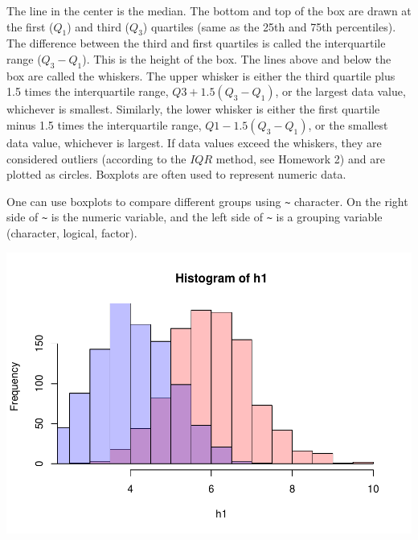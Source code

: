 \documentclass[
]{book}
\newenvironment{Shaded}{\begin{snugshade}}{\end{snugshade}}
\newcommand{\DecValTok}[1]{\textcolor[rgb]{0.00,0.00,0.81}{#1}}
\newcommand{\KeywordTok}[1]{\textcolor[rgb]{0.13,0.29,0.53}{\textbf{#1}}}
\newcommand{\NormalTok}[1]{#1}
\newcommand{\OperatorTok}[1]{\textcolor[rgb]{0.81,0.36,0.00}{\textbf{#1}}}
\newcommand{\StringTok}[1]{\textcolor[rgb]{0.31,0.60,0.02}{#1}}
\begin{document}
The line in the center is the median. The bottom and top of the box are drawn at the first (\(Q_1\)) and third (\(Q_3\)) quartiles (same as the 25th and 75th percentiles). The difference between the third and first quartiles is called the interquartile range (\(Q_3-Q_1\)). This is the height of the box. The lines above and below the box are called the whiskers. The upper whisker is either the third quartile plus 1.5 times the interquartile range, \(Q3 +1.5(Q_3-Q_1)\), or the largest data value, whichever is smallest. Similarly, the lower whisker is either the first quartile minus 1.5 times the interquartile range, \(Q1-1.5(Q_3-Q_1)\), or the smallest data value, whichever is largest. If data values exceed the whiskers, they are considered outliers (according to the \(IQR\) method, see Homework 2) and are plotted as circles. Boxplots are often used to represent numeric data.

One can use boxplots to compare different groups using \texttt{\textasciitilde{}} character. On the right side of \texttt{\textasciitilde{}} is the numeric variable, and the left side of \texttt{\textasciitilde{}} is a grouping variable (character, logical, factor).

\begin{Shaded}
\end{Shaded}

\includegraphics{_main_files/figure-latex/unnamed-chunk-175-1.pdf}
\end{document}
